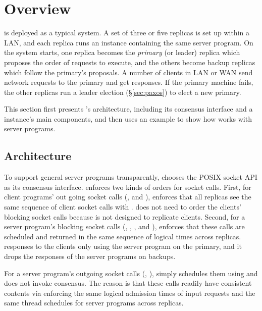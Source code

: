 \section{\xxx Overview} \label{sec:overview}

\xxx is deployed as a typical \smr system. A set of three or five replicas is 
set up within a LAN, and each replica runs an \xxx instance containing the 
same server program. On the \xxx system starts, one replica becomes the 
\emph{primary} (or leader) replica which proposes the order of requests to 
execute, and the others become backup replicas which follow the primary's 
proposals. A number of clients in LAN or WAN send network requests 
to the primary and get responses.  If the primary machine fails, the other 
replicas run a leader election (\S\ref{sec:paxos}) to elect a new primary.

This section first presents \xxx's architecture, including its consensus 
interface and a \xxx instance's main components, and then uses an 
example to show how \xxx works with server programs.


\subsection{Architecture} \label{sec:abstraction}

To support general server programs transparently, \xxx chooses the POSIX socket 
API as its consensus interface. \xxx enforces two kinds of orders for socket
calls. First, for client programs' out going socket calls (\eg, \connect and
\send), \xxx enforces that all replicas see the same sequence of client socket 
calls with \paxos. \xxx does not need to order the clients' 
blocking socket calls because \xxx is not designed to replicate clients. 
Second, for a server program's blocking socket calls (\eg, \poll, \accept, and 
\recv), \xxx enforces that these calls are scheduled and 
returned in the same sequence of logical times across replicas. \xxx 
responses to the clients only using the server program on the primary, and it 
drops the responses of the server programs on backups.

For a server program's outgoing socket calls (\eg, \send), \xxx simply 
schedules them using \dmt and does not invoke consensus. The 
reason is that these calls readily have consistent contents via enforcing 
the same logical admission times of input requests and the same thread 
schedules for server programs across replicas.


